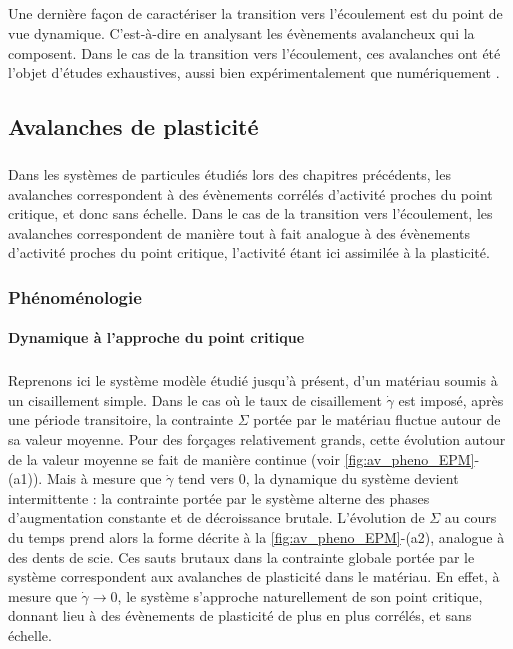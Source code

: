 \subparagraph{}Une dernière façon de caractériser la transition vers l'écoulement est du point de vue dynamique. C'est-à-dire en analysant les évènements avalancheux qui la composent. Dans le cas de la transition vers l'écoulement, ces avalanches ont été l'objet d'études exhaustives, aussi bien expérimentalement que numériquement \cite{sun_plasticity_2010, lauridsen_shear-induced_2002, salerno_effect_2013, oyama_unified_2021, talamali_avalanches_2011, liu_driving_2016}.

\subsection{Avalanches de plasticité}

\subparagraph{}Dans les systèmes de particules étudiés lors des chapitres précédents, les avalanches correspondent à des évènements corrélés d'activité proches du point critique, et donc sans échelle. Dans le cas de la transition vers l'écoulement, les avalanches correspondent de manière tout à fait analogue à des évènements d'activité proches du point critique, l'activité étant ici assimilée à la plasticité.

\subsubsection{Phénoménologie}

\paragraph{Dynamique à l'approche du point critique}

\subparagraph{}Reprenons ici le système modèle étudié jusqu'à présent, d'un matériau soumis à un cisaillement simple. Dans le cas où le taux de cisaillement $\dot{\gamma}$ est imposé, après une période transitoire, la contrainte $\Sigma$ portée par le matériau fluctue autour de sa valeur moyenne. Pour des forçages relativement grands, cette évolution autour de la valeur moyenne se fait de manière continue (voir \autoref{fig:av_pheno_EPM}-(a1)). Mais à mesure que $\dot{\gamma}$ tend vers 0, la dynamique du système devient intermittente \cite{nicolas_deformation_2018} : la contrainte portée par le système alterne des phases d'augmentation constante et de décroissance brutale. L'évolution de $\Sigma$ au cours du temps prend alors la forme décrite à la \autoref{fig:av_pheno_EPM}-(a2), analogue à des dents de scie. Ces sauts brutaux dans la contrainte globale portée par le système correspondent aux avalanches de plasticité dans le matériau. En effet, à mesure que $\dot{\gamma}\rightarrow 0$, le système s'approche naturellement de son point critique, donnant lieu à des évènements de plasticité de plus en plus corrélés, et sans échelle.

